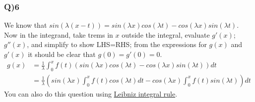 \documentclass[11pt]{beamer}
\begin{document}
\begin{frame}
\frametitle{Q)6}
We know that $sin (\lambda (x-t))=sin(\lambda x)cos(\lambda t)-cos(\lambda x) sin(\lambda t)$. Now in the integrand, take trems in $x$
outside the integral, evaluate $g'(x)$; $g''(x)$, and simplify to show LHS=RHS; from the
expressions for $g(x)$ and $g'(x)$ it should be clear that $g(0)=g'(0)=0$.
\begin{align*}
g(x)&=\frac{1}{\lambda}\int_0^xf(t)(sin(\lambda x)cos(\lambda t)-cos(\lambda x) sin(\lambda t))dt\\
&=\frac{1}{\lambda}\left(sin(\lambda x)\int_0^xf(t)cos(\lambda t)dt-cos(\lambda x)\int_0^xf(t)sin(\lambda t) \right)dt
\end{align*}
You can also do this question using \href{https://en.wikipedia.org/wiki/Leibniz_integral_rule}{Leibniz integral rule}.
\end{frame}
\end{document}
